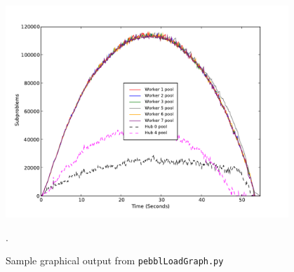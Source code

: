 \begin{figure}[t]
\begin{center}
\vspace{-0.3in}
\includegraphics[width=0.95\textwidth]{sample-load-graph}
\vspace{-0.45in}
\end{center}
\caption{Sample graphical output from \texttt{pebblLoadGraph.py}}.
\label{fig:loadGraph}
\end{figure}
